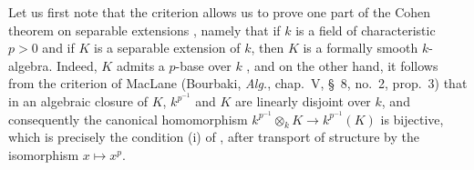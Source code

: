 \begin{env}[21.5.1]
\label{0.21.5.1}
Let us first note that the criterion  allows us to prove one part of the Cohen theorem on separable extensions , namely that if $k$ is a field of characteristic $p>0$ and if $K$ is a separable extension of $k$, then $K$ is a formally smooth $k$-algebra.
Indeed, $K$ admits a $p$-base over $k$ , and on the other hand, it follows from the criterion of MacLane (Bourbaki, \emph{Alg.}, chap.~V, \S~8, no.~2, prop.~3) that in an algebraic closure of $K$, $k^{p^{-1}}$ and $K$ are linearly disjoint over $k$, and consequently the canonical homomorphism $k^{p^{-1}}\otimes_k K\to k^{p^{-1}}(K)$ is bijective, which is precisely the condition (i) of , after transport of structure by the isomorphism $x\mapsto x^p$.
\end{env}

